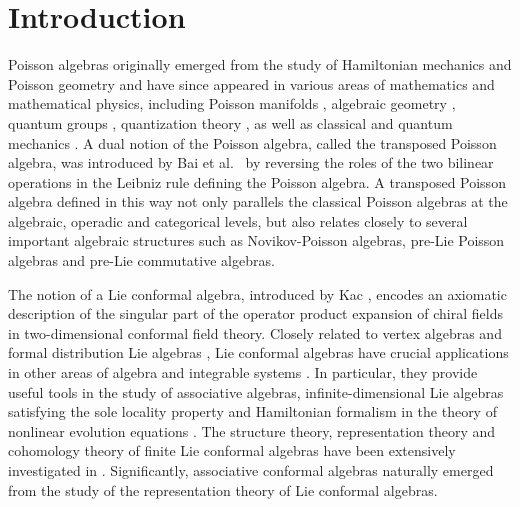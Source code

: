 \documentclass[11pt,letterpaper,reqno]{amsart}
\theoremstyle{definition}
\numberwithin{equation}{section}
\begin{document}
\section{Introduction}
Poisson algebras originally emerged from the study of Hamiltonian mechanics \cite{Arn78,Mac70} and Poisson geometry \cite{Vais20,Wein77} and have since appeared in various areas of mathematics and mathematical physics, including
Poisson manifolds \cite{Bha88,Vai94}, algebraic geometry \cite{Bell17,Pol97}, quantum groups \cite{Cha94,Etin98}, quantization theory \cite{Hue90,Kont03}, as well as classical and quantum mechanics \cite{Bay77,Dir67}.
A dual notion of the Poisson algebra, called the transposed Poisson algebra, was introduced by Bai et al.~\cite{Bai23} by reversing the roles of the two bilinear operations in the Leibniz rule defining the Poisson algebra.
A transposed Poisson algebra defined in this way not only parallels the classical Poisson algebras at the algebraic, operadic and categorical levels, but also relates closely to several important algebraic structures such as Novikov-Poisson algebras, pre-Lie Poisson algebras and pre-Lie commutative algebras.

The notion of a Lie conformal algebra, introduced by Kac \cite{Kac98}, encodes an axiomatic description of the singular part of the operator product expansion of chiral fields in two-dimensional conformal field theory.
Closely related to vertex algebras and formal distribution Lie algebras \cite{Chen25,Li96}, Lie conformal algebras have crucial applications in other areas of algebra and integrable systems \cite{Zelm20,Zelm03}. In particular, they provide useful tools in the study of associative algebras, infinite-dimensional Lie algebras satisfying the sole locality property \cite{Su13} and Hamiltonian formalism in the theory of nonlinear evolution equations \cite{Bara09}.
The structure theory, representation theory and cohomology theory of finite Lie conformal algebras have been extensively investigated in \cite{BKV99,CK97,DAK98,SXY20,WY17}.
Significantly, associative conformal algebras naturally emerged from the study of the representation theory of Lie conformal algebras.
\end{document}
